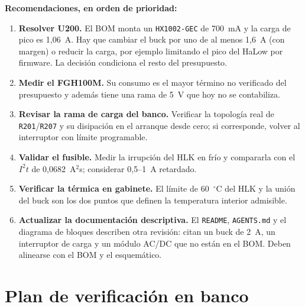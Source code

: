 \documentclass[11pt,a4paper]{article}
\begin{document}
\noindent\textbf{Recomendaciones, en orden de prioridad:}
\begin{enumerate}
  \item \textbf{Resolver U200.} El BOM monta un \texttt{HX1002-GEC} de 700~mA y
        la carga de pico es 1,06~A. Hay que cambiar el buck por uno de al menos
        1,6~A (con margen) o reducir la carga, por ejemplo limitando el pico del
        HaLow por firmware. La decisión condiciona el resto del presupuesto.
  \item \textbf{Medir el FGH100M.} Su consumo es el mayor término no verificado
        del presupuesto y además tiene una rama de 5~V que hoy no se contabiliza.
  \item \textbf{Revisar la rama de carga del banco.} Verificar la topología real
        de \texttt{R201}/\texttt{R207} y su disipación en el arranque desde cero;
        si corresponde, volver al interruptor con límite programable.
  \item \textbf{Validar el fusible.} Medir la irrupción del HLK en frío y
        compararla con el $I^2t$ de 0,0682~A$^2$s; considerar 0,5--1~A
        retardado.
  \item \textbf{Verificar la térmica en gabinete.} El límite de 60~$^\circ$C del
        HLK y la unión del buck son los dos puntos que definen la temperatura
        interior admisible.
  \item \textbf{Actualizar la documentación descriptiva.} El \texttt{README},
        \texttt{AGENTS.md} y el diagrama de bloques describen otra revisión:
        citan un buck de 2~A, un interruptor de carga y un módulo AC/DC que no
        están en el BOM. Deben alinearse con el BOM y el esquemático.
\end{enumerate}

\section{Plan de verificación en banco}
\label{sec:verificacion}
\end{document}
